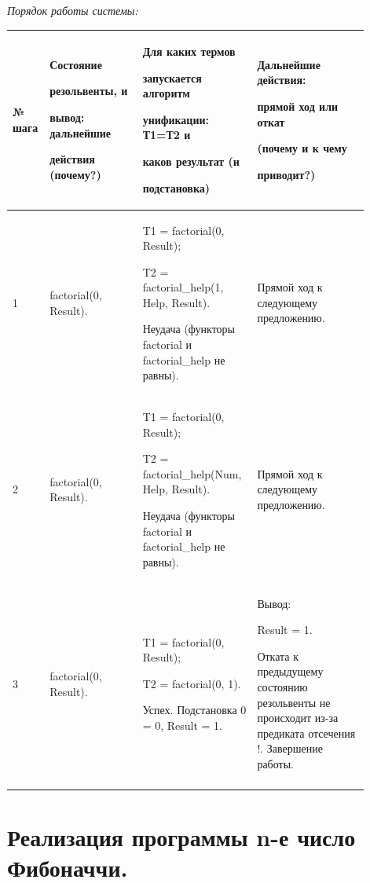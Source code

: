 \documentclass[a4paper,12pt]{article}
\begin{document}
	\textit{Порядок работы системы:}
	
	\begin{center}
		\begin{longtable}[h!]{|p{0.05\linewidth}|p{0.25\linewidth}|p{ 0.3\linewidth}|p{ 0.3\linewidth}|}
			\hline
			{№ шага} & {Состояние 
				
				резольвенты, и 
				
				вывод: дальнейшие 
				
				действия (почему?)} & {Для каких термов 
				
				запускается алгоритм 
				
				унификации: Т1=Т2 и 
				
				каков {\bf результат} (и 
				
				подстановка)} & {Дальнейшие действия: 
				
				прямой ход или откат 
				
				(почему и к чему 
				
				приводит?)}\\
			\hline
			{1} & {factorial(0, Result).} & {T1 = factorial(0, Result);
			
		T2 = factorial\_help(1, Help, Result).
	
Неудача (функторы factorial и factorial\_help не равны).} & {Прямой ход к следующему предложению.}\\
			\hline
			{2} & {factorial(0, Result).} & {T1 = factorial(0, Result);
			
		T2 = factorial\_help(Num, Help, Result).
	
Неудача (функторы factorial и factorial\_help не равны).} & {Прямой ход к следующему предложению.}\\
			\hline
			{3} & {factorial(0, Result).} & {T1 = factorial(0, Result);
			
		T2 = factorial(0, 1).
	
Успех. Подстановка 0 = 0, Result = 1.} & {Вывод:

Result = 1.

Отката к предыдущему состоянию резольвенты не происходит из-за предиката отсечения !. Завершение работы.}\\
			\hline
			
\label{m2}
		\end{longtable}
	\end{center}
	
	\section*{Реализация программы n-е число Фибоначчи.}
	
\end{document}
